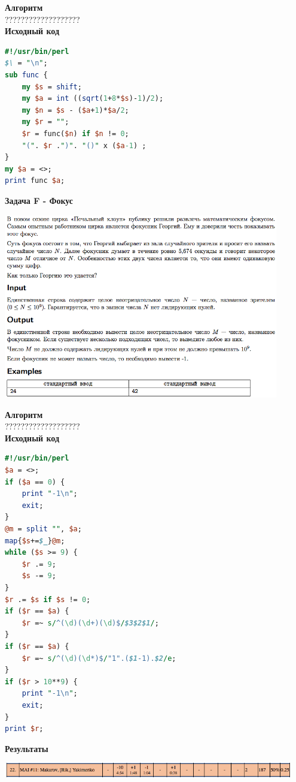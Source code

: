\documentclass[a4paper,12pt]{article}
\begin{document}
\textbf{{\large Алгоритм}} \\
{\Huge ???????????????????} \\ 

\textbf{{\large Исходный код}}
\begin{lstlisting}[language=Perl]
#!/usr/bin/perl
$\ = "\n";
sub func {
	my $s = shift;
	my $a = int ((sqrt(1+8*$s)-1)/2);
	my $n = $s - ($a+1)*$a/2;
	my $r = "";
	$r = func($n) if $n != 0;
	"(". $r .")". "()" x ($a-1) ;
}
my $a = <>;
print func $a;
\end{lstlisting}

\textbf{{\large Задача F - Фокус}} \\
\begin{center}
\includegraphics[width=0.9\textwidth]{OC_Ural/OC_Ural_F.png}\\ [1cm]
\end{center}
\newpage

\textbf{{\large Алгоритм}} \\
{\Huge ???????????????????} \\ 

\textbf{{\large Исходный код}}
\begin{lstlisting}[language=Perl]
#!/usr/bin/perl
$a = <>;
if ($a == 0) {
	print "-1\n";
	exit;
}
@m = split "", $a;
map{$s+=$_}@m;
while ($s >= 9) {
	$r .= 9;
	$s -= 9;
}
$r .= $s if $s != 0;
if ($r == $a) {
	$r =~ s/^(\d)(\d+)(\d)$/$3$2$1/;
}
if ($r == $a) {
	$r =~ s/^(\d)(\d*)$/"1".($1-1).$2/e;
}
if ($r > 10**9) {
	print "-1\n";
	exit;
}
print $r;
\end{lstlisting}

\textbf{{\large Результаты}} \\
\begin{center}
\includegraphics[width=0.95\textwidth]{OC_Ural/OC_Ural_result.png}\\ [1cm]
\end{center}
\end{document}
